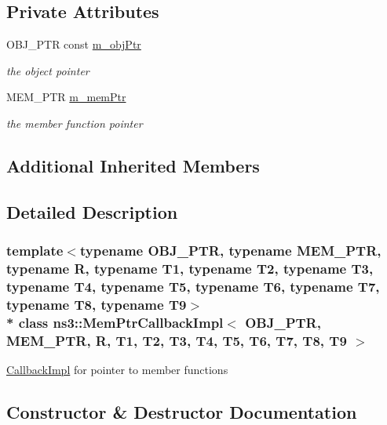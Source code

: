 \subsection*{Private Attributes}
\begin{DoxyCompactItemize}
\item 
O\+B\+J\+\_\+\+P\+TR const \hyperlink{classns3_1_1MemPtrCallbackImpl_a9df02a22837d1625d53331ae0924f89c}{m\+\_\+obj\+Ptr}
\begin{DoxyCompactList}\small\item\em the object pointer \end{DoxyCompactList}\item 
M\+E\+M\+\_\+\+P\+TR \hyperlink{classns3_1_1MemPtrCallbackImpl_a5f7142cdfa4bb1a88393a57d7f544c54}{m\+\_\+mem\+Ptr}
\begin{DoxyCompactList}\small\item\em the member function pointer \end{DoxyCompactList}\end{DoxyCompactItemize}
\subsection*{Additional Inherited Members}


\subsection{Detailed Description}
\subsubsection*{template$<$typename O\+B\+J\+\_\+\+P\+TR, typename M\+E\+M\+\_\+\+P\+TR, typename R, typename T1, typename T2, typename T3, typename T4, typename T5, typename T6, typename T7, typename T8, typename T9$>$\\*
class ns3\+::\+Mem\+Ptr\+Callback\+Impl$<$ O\+B\+J\+\_\+\+P\+T\+R, M\+E\+M\+\_\+\+P\+T\+R, R, T1, T2, T3, T4, T5, T6, T7, T8, T9 $>$}

\hyperlink{classns3_1_1CallbackImpl}{Callback\+Impl} for pointer to member functions 

\subsection{Constructor \& Destructor Documentation}
